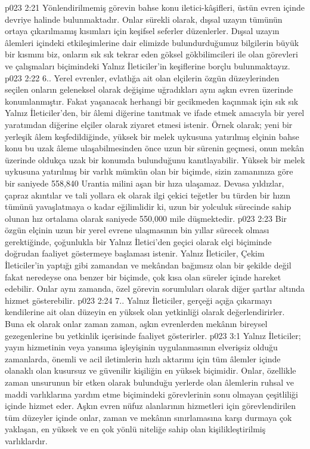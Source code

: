 \vs p023 2:21 Yönlendirilmemiş görevin bahse konu iletici\hyp{}kâşifleri, üstün evren içinde devriye halinde bulunmaktadır. Onlar sürekli olarak, dışsal uzayın tümünün ortaya çıkarılmamış kısımları için keşifsel seferler düzenlerler. Dışsal uzayın âlemleri içindeki etkileşimlerine dair elimizde bulundurduğumuz bilgilerin büyük bir kısmını biz, onların sık sık tekrar eden göksel gökbilimcileri ile olan görevleri ve çalışmaları biçimindeki Yalnız İleticiler’in keşiflerine borçlu bulunmaktayız.
\vs p023 2:22 6.\bibnobreakspace {}. Yerel evrenler, evlatlığa ait olan elçilerin özgün düzeylerinden seçilen onların geleneksel olarak değişime uğradıkları aynı aşkın evren üzerinde konumlanmıştır. Fakat yaşanacak herhangi bir gecikmeden kaçınmak için sık sık Yalnız İleticiler’den, bir âlemi diğerine tanıtmak ve ifade etmek amacıyla bir yerel yaratımdan diğerine elçiler olarak ziyaret etmesi istenir. Örnek olarak; yeni bir yerleşik âlem keşfedildiğinde, yüksek bir melek uykusuna yatırılmış elçinin bahse konu bu uzak âleme ulaşabilmesinden önce uzun bir sürenin geçmesi, onun mekân üzerinde oldukça uzak bir konumda bulunduğunu kanıtlayabilir. Yüksek bir melek uykusuna yatırılmış bir varlık mümkün olan bir biçimde, sizin zamanınıza göre bir saniyede 558,840 Urantia milini aşan bir hıza ulaşamaz. Devasa yıldızlar, çapraz akıntılar ve tali yollara ek olarak ilgi çekici teğetler bu türden bir hızın tümünü yavaşlatmaya o kadar eğilimlidir ki, uzun bir yolculuk sürecinde sahip olunan hız ortalama olarak saniyede 550,000 mile düşmektedir.
\vs p023 2:23 Bir özgün elçinin uzun bir yerel evrene ulaşmasının bin yıllar sürecek olması gerektiğinde, çoğunlukla bir Yalnız İletici’den geçici olarak elçi biçiminde doğrudan faaliyet göstermeye başlaması istenir. Yalnız İleticiler, Çekim İleticiler’in yaptığı gibi zamandan ve mekândan bağımsız olan bir şekilde değil fakat neredeyse ona benzer bir biçimde, çok kısa olan süreler içinde hareket edebilir. Onlar aynı zamanda, özel görevin sorumluları olarak diğer şartlar altında hizmet gösterebilir.
\vs p023 2:24 7.\bibnobreakspace {}. Yalnız İleticiler, gerçeği açığa çıkarmayı kendilerine ait olan düzeyin en yüksek olan yetkinliği olarak değerlendirirler. Buna ek olarak onlar zaman zaman, aşkın evrenlerden mekânın bireysel gezegenlerine bu yetkinlik içerisinde faaliyet gösterirler.
\vs p023 3:1 Yalnız İleticiler; yayın hizmetinin veya yansıma işleyişinin uygulanmasının elverişsiz olduğu zamanlarda, önemli ve acil iletimlerin hızlı aktarımı için tüm âlemler içinde olanaklı olan kusursuz ve güvenilir kişiliğin en yüksek biçimidir. Onlar, özellikle zaman unsurunun bir etken olarak bulunduğu yerlerde olan âlemlerin ruhsal ve maddi varlıklarına yardım etme biçimindeki görevlerinin sonu olmayan çeşitliliği içinde hizmet eder. Aşkın evren nüfuz alanlarının hizmetleri için görevlendirilen tüm düzeyler içinde onlar, zaman ve mekânın sınırlamasına karşı durmaya çok yaklaşan, en yüksek ve en çok yönlü niteliğe sahip olan kişilikleştirilmiş varlıklardır.
